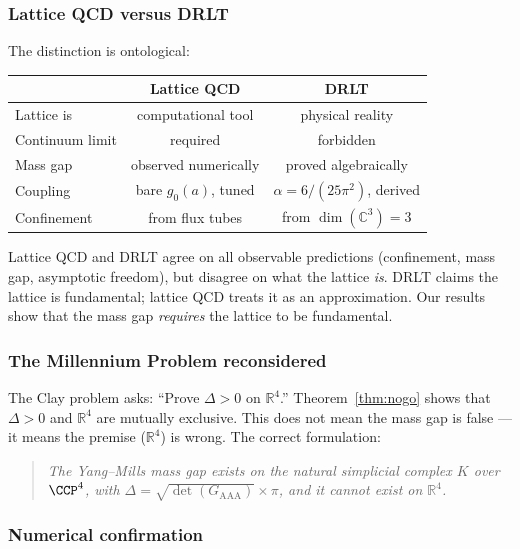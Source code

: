 \documentclass[12pt]{article}
\theoremstyle{remark}
\theoremstyle{definition}
\newcommand{\CC}{\mathbb{C}}
\newcommand{\RR}{\mathbb{R}}
\begin{document}
\subsubsection{Lattice QCD versus DRLT}

The distinction is ontological:

\begin{center}
\begin{tabular}{lcc}
\hline
& Lattice QCD & DRLT \\
\hline
Lattice is & computational tool & physical reality \\
Continuum limit & required & forbidden \\
Mass gap & observed numerically & proved algebraically \\
Coupling & bare $g_0(a)$, tuned & $\alpha = 6/(25\pi^2)$, derived \\
Confinement & from flux tubes & from $\dim(\CC^3) = 3$ \\
\hline
\end{tabular}
\end{center}

\noindent
Lattice QCD and DRLT agree on all observable predictions (confinement,
mass gap, asymptotic freedom), but disagree on what the lattice \emph{is}.
DRLT claims the lattice is fundamental; lattice QCD treats it as an
approximation. Our results show that the mass gap \emph{requires}
the lattice to be fundamental.

\subsubsection{The Millennium Problem reconsidered}

The Clay problem asks: ``Prove $\Delta > 0$ on $\RR^4$.''
Theorem~\ref{thm:nogo} shows that $\Delta > 0$ and $\RR^4$ are
mutually exclusive. This does not mean the mass gap is false --- it
means the premise ($\RR^4$) is wrong. The correct formulation:

\begin{quote}
\emph{The Yang--Mills mass gap exists on the natural simplicial complex
$K$ over $\CCP^4$, with $\Delta = \sqrt{\det(G_{\mathrm{AAA}})}
\times \pi$, and it cannot exist on $\RR^4$.}
\end{quote}

\subsubsection{Numerical confirmation}
\end{document}
